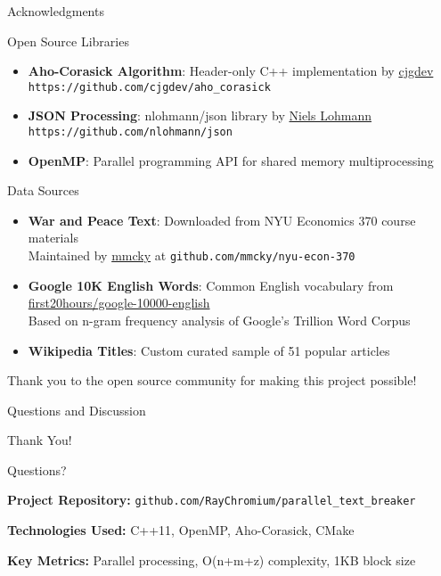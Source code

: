 \documentclass[aspectratio=169]{beamer}
\begin{document}
\begin{frame}{Acknowledgments}
\begin{block}{Open Source Libraries}
\begin{itemize}
    \item \textbf{Aho-Corasick Algorithm}: Header-only C++ implementation by \href{https://github.com/cjgdev}{cjgdev} \\
    \small{\texttt{https://github.com/cjgdev/aho\_corasick}}
    \item \textbf{JSON Processing}: nlohmann/json library by \href{https://github.com/nlohmann}{Niels Lohmann} \\
    \small{\texttt{https://github.com/nlohmann/json}}
    \item \textbf{OpenMP}: Parallel programming API for shared memory multiprocessing
\end{itemize}
\end{block}

\begin{block}{Data Sources}
\begin{itemize}
    \item \textbf{War and Peace Text}: Downloaded from NYU Economics 370 course materials \\
    \small{Maintained by \href{https://github.com/mmcky}{mmcky} at \texttt{github.com/mmcky/nyu-econ-370}}
    \item \textbf{Google 10K English Words}: Common English vocabulary from \href{https://github.com/first20hours/google-10000-english}{first20hours/google-10000-english} \\
    \small{Based on n-gram frequency analysis of Google's Trillion Word Corpus}
    \item \textbf{Wikipedia Titles}: Custom curated sample of 51 popular articles
\end{itemize}
\end{block}

\vspace{0.2cm}
\begin{center}
\small{Thank you to the open source community for making this project possible!}
\end{center}
\end{frame}

\begin{frame}{Questions and Discussion}
\begin{center}
\Huge Thank You!

\vspace{1cm}
\Large Questions?

\vspace{1cm}
\normalsize
\textbf{Project Repository:} \texttt{github.com/RayChromium/parallel\_text\_breaker}

\textbf{Technologies Used:} C++11, OpenMP, Aho-Corasick, CMake

\textbf{Key Metrics:} Parallel processing, O(n+m+z) complexity, 1KB block size
\end{center}
\end{frame}
\end{document}

